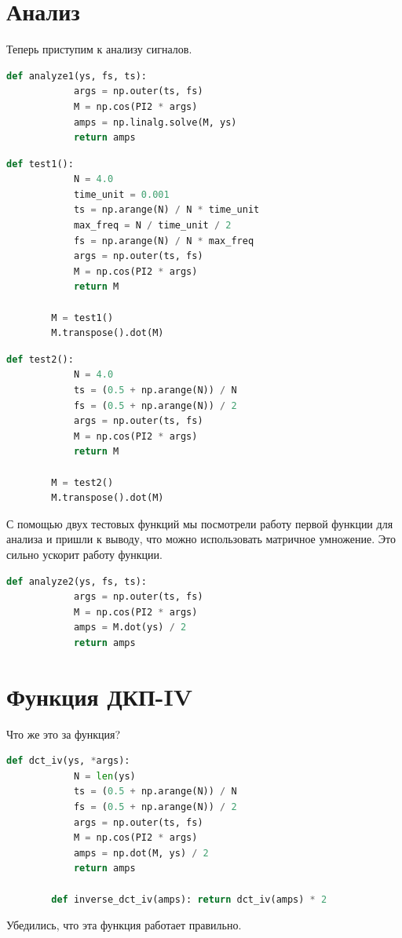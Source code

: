 \documentclass[a4paper, 12pt]{report}
\begin{document}
	\chapter{Анализ}
	Теперь приступим к анализу сигналов.
	\begin{lstlisting}[language=Python,caption=Первая функция для анализа]
		def analyze1(ys, fs, ts):
			args = np.outer(ts, fs)
			M = np.cos(PI2 * args)
			amps = np.linalg.solve(M, ys)
			return amps
	\end{lstlisting}
	\begin{lstlisting}[language=Python,caption=Первая функция для тестирования]
		def test1():
			N = 4.0
			time_unit = 0.001
			ts = np.arange(N) / N * time_unit
			max_freq = N / time_unit / 2
			fs = np.arange(N) / N * max_freq
			args = np.outer(ts, fs)
			M = np.cos(PI2 * args)
			return M

		M = test1()
		M.transpose().dot(M)
	\end{lstlisting}
	\begin{lstlisting}[language=Python,caption=Вторая функция для тестирования]
		def test2():
			N = 4.0
			ts = (0.5 + np.arange(N)) / N
			fs = (0.5 + np.arange(N)) / 2
			args = np.outer(ts, fs)
			M = np.cos(PI2 * args)
			return M
    
		M = test2()
		M.transpose().dot(M)
	\end{lstlisting}
	С помощью двух тестовых функций мы посмотрели работу первой функции для анализа и пришли к выводу, что можно использовать матричное умножение. Это сильно ускорит работу функции.
	\begin{lstlisting}[language=Python,caption=Вторая функция для анализа]
		def analyze2(ys, fs, ts):
			args = np.outer(ts, fs)
			M = np.cos(PI2 * args)
			amps = M.dot(ys) / 2
			return amps
	\end{lstlisting}
	
	\chapter{Функция ДКП-IV}
	Что же это за функция?
	\begin{lstlisting}[language=Python,caption=Функция ДКП-IV]
		def dct_iv(ys, *args):
			N = len(ys)
			ts = (0.5 + np.arange(N)) / N
			fs = (0.5 + np.arange(N)) / 2
			args = np.outer(ts, fs)
			M = np.cos(PI2 * args)
			amps = np.dot(M, ys) / 2
			return amps

		def inverse_dct_iv(amps): return dct_iv(amps) * 2
	\end{lstlisting}
	Убедились, что эта функция работает правильно.
\end{document}
